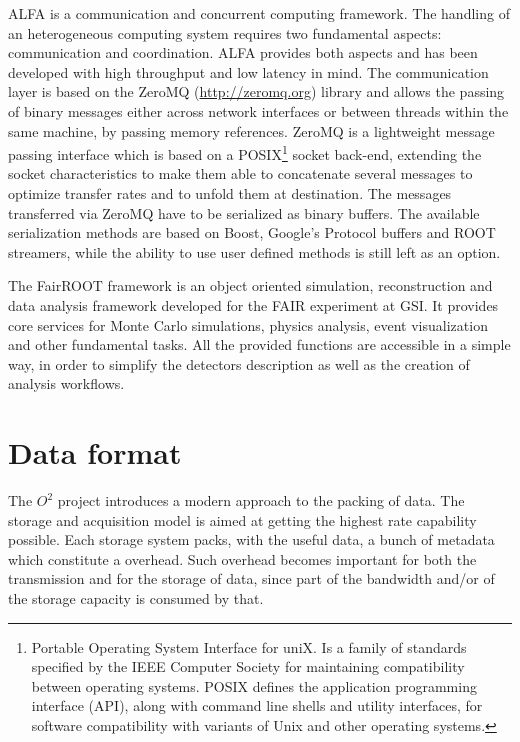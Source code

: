 ALFA is a communication and concurrent computing framework.
The handling of an heterogeneous computing system requires two fundamental aspects: communication and coordination.
ALFA provides both aspects and has been developed with high throughput and low latency in mind.
The communication layer is based on the ZeroMQ (\hyperref[reference]{http://zeromq.org}) library and allows the passing of binary messages either across network interfaces or between threads within the same machine, by passing memory references.
ZeroMQ is a lightweight message passing interface which is based on a POSIX\footnote{Portable Operating System Interface for uniX. Is a family of standards specified by the IEEE Computer Society for maintaining compatibility between operating systems. POSIX defines the application programming interface (API), along with command line shells and utility interfaces, for software compatibility with variants of Unix and other operating systems.} socket back-end, extending the socket characteristics to make them able to concatenate several messages to optimize transfer rates and to unfold them at destination.
The messages transferred via ZeroMQ have to be serialized as binary buffers.
The available serialization methods are based on Boost, Google's Protocol buffers and ROOT streamers, while the ability to use user defined methods is still left as an option.

The FairROOT framework is an object oriented simulation, reconstruction and data analysis framework  developed for the FAIR experiment at GSI.
It provides core services for Monte Carlo simulations, physics analysis, event visualization and other fundamental tasks.
All the provided functions are accessible in a simple way, in order to simplify the detectors description as well as the creation of analysis workflows.

\section{Data format}
The $O^2$ project introduces a modern approach to the packing of data.
The storage and acquisition model is aimed at getting the highest rate capability possible.
Each storage system packs, with the useful data, a bunch of metadata which constitute a overhead.
Such overhead becomes important for both the transmission and for the storage of data, since part of the bandwidth and/or of the storage capacity is consumed by that.

